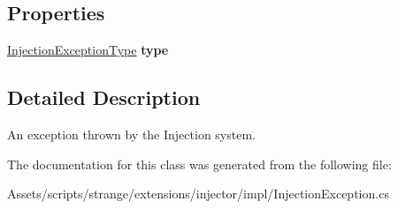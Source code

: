 \subsection*{Properties}
\begin{DoxyCompactItemize}
\item 
\hypertarget{classstrange_1_1extensions_1_1injector_1_1impl_1_1_injection_exception_a30971ecda24e1af5e691b05db615f91e}{\hyperlink{namespacestrange_1_1extensions_1_1injector_1_1api_a465caee64cba80e952ad7dd9a050e6c3}{Injection\-Exception\-Type} {\bfseries type}}\label{classstrange_1_1extensions_1_1injector_1_1impl_1_1_injection_exception_a30971ecda24e1af5e691b05db615f91e}

\end{DoxyCompactItemize}


\subsection{Detailed Description}
An exception thrown by the Injection system. 

The documentation for this class was generated from the following file\-:\begin{DoxyCompactItemize}
\item 
Assets/scripts/strange/extensions/injector/impl/Injection\-Exception.\-cs\end{DoxyCompactItemize}
